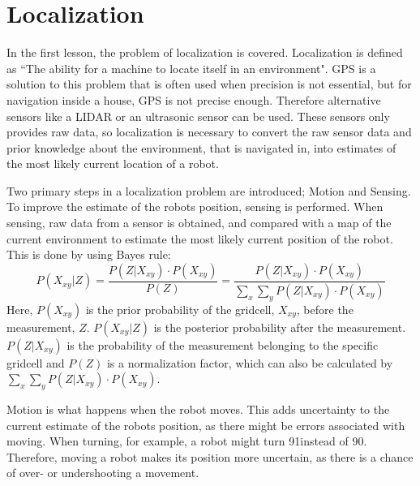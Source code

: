 \documentclass[Main]{subfiles}
\begin{document}
\section{Localization} %
	\label{sec:localization}
In the first lesson, the problem of localization is covered. 
Localization is defined as “The ability for a machine to locate itself in an environment". 
GPS is a solution to this problem that is often used when precision is not essential, but for navigation inside a house, GPS is not precise enough. 
Therefore alternative sensors like a LIDAR or an ultrasonic sensor can be used. 
These sensors only provides raw data, so localization is necessary to convert the raw sensor data and prior knowledge about the environment, that is navigated in, into estimates of the most likely current location of a robot.

Two primary steps in a localization problem are introduced; Motion and Sensing.
To improve the estimate of the robots position, sensing is performed. 
When sensing, raw data from a sensor is obtained, and compared with a map of the current environment to estimate the most likely current position of the robot. 
This is done by using Bayes rule:
\begin{equation}
\label{eq:bayes_rule}
P(X_{xy}|Z) = \frac{P(Z|X_{xy})\cdot P(X_{xy})}{P(Z)} = \frac{P(Z|X_{xy})\cdot P(X_{xy})}{\sum_{x} \sum_{y} P(Z|X_{xy})\cdot P(X_{xy})}
\end{equation}
Here, $P(X_{xy})$ is the prior probability of the gridcell, $X_{xy}$, before the measurement, $Z$.
$P(X_{xy}|Z)$ is the posterior probability after the measurement. 
$P(Z|X_{xy})$ is the probability of the measurement belonging to the specific gridcell and $P(Z)$ is a normalization factor, which can also be calculated by $\sum_{x} \sum_{y} P(Z|X_{xy})\cdot P(X_{xy})$.

Motion is what happens when the robot moves. 
This adds uncertainty to the current estimate of the robots position, as there might be errors associated with moving. 
When turning, for example, a robot might turn 91\degree instead of 90\degree. 
Therefore, moving a robot makes its position more uncertain, as there is a chance of over- or undershooting a movement.
\end{document}
